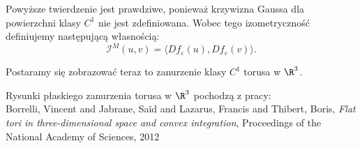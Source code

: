 \begin{frame}

\begin{uwaga}
Powyższe twierdzenie jest prawdziwe, ponieważ krzywizna Gaussa dla powierzchni klasy $C^1$ nie jest zdefiniowana. Wobec tego izometryczność definiujemy następującą własnością:
\[\mathcal{I}^M(u,v)=\langle Df_\varepsilon(u), Df_\varepsilon(v) \rangle.\]
\end{uwaga}
\pause Postaramy się zobrazować teraz to zanurzenie klasy $C^1$ torusa w $\R^3$. %


\vfill \footnotesize{Rysunki płaskiego zanurzenia torusa w $\R^3$ pochodzą z pracy:\\
Borrelli, Vincent and Jabrane, Saïd and Lazarus, Francis and Thibert, Boris,
\textit{Flat tori in three-dimensional space and convex integration}, Proceedings of the National Academy of Sciences, 2012}



\end{frame}
\newpage
